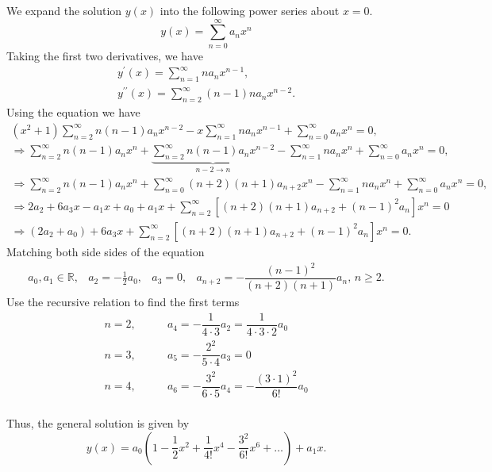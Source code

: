 \documentclass[11pt]{article}
\begin{document}
\begin{solution}
 We expand the solution $y(x)$ into the following power series about $x=0$.
\begin{equation*}
y(x) = \sum_{n=0}^{\infty} a_{n} x^n
\end{equation*}
Taking the first two derivatives, we have
\begin{gather*}
y^{\prime}(x) =  \sum_{n=1}^{\infty} n a_{n} x^{n-1}, \\
y^{\prime \prime}(x) = \sum_{n=2}^{\infty} (n-1)n a_{n} x^{n-2}.
\end{gather*}
Using the equation we have
\begin{gather*}
(x^2 + 1)\sum_{n=2}^{\infty}n(n-1)a_{n}x^{n-2} -x \sum_{n=1}^{\infty} na_{n}x^{n-1} + \sum_{n=0}^{\infty} a_{n}x^{n} = 0, \\
\Rightarrow \sum_{n=2}^{\infty}n(n-1)a_{n}x^{n} + \underbrace{\sum_{n=2}^{\infty}n(n-1)a_{n}x^{n-2}}_{n-2\rightarrow n} - \sum_{n=1}^{\infty} na_{n}x^{n} + \sum_{n=0}^{\infty} a_{n}x^{n} = 0, \\
\Rightarrow \sum_{n=2}^{\infty}n(n-1)a_{n}x^{n} + \sum_{n=0}^{\infty}(n+2)(n+1)a_{n+2}x^{n} - \sum_{n=1}^{\infty} na_{n}x^{n} + \sum_{n=0}^{\infty} a_{n}x^{n} = 0, \\
\Rightarrow 2a_{2} + 6 a_{3}x - a_{1}x + a_{0} + a_{1}x + \sum_{n=2}^{\infty}[(n+2)(n+1)a_{n+2} + (n-1)^{2}a_{n}]x^{n} =0 \\
\Rightarrow (2a_{2} + a_{0}) + 6 a_{3} x + \sum_{n=2}^{\infty}[(n+2)(n+1)a_{n+2} + (n-1)^{2}a_{n}]x^{n} =0.
\end{gather*}
Matching both side sides  of the equation
\begin{equation*}
\begin{array}{cccc}
a_{0},a_{1}\in \mathbb{R}, & a_{2}=-\frac{1}{2}a_{0}, & a_{3}=0, & a_{n+2}=-\dfrac{(n-1)^{2}}{(n+2)(n+1)}a_{n},\,n\geq 2.
\end{array}
\end{equation*}
Use the recursive relation to find the first terms
\begin{align*}
n=2, & \qquad a_{4}=-\dfrac{1}{4\cdot 3} a_{2} = \dfrac{1}{4\cdot 3\cdot 2}a_{0}\\
n=3, & \qquad a_{5}=-\dfrac{2^{2}}{5\cdot 4} a_{3} = 0\\
n=4, & \qquad a_{6}=-\dfrac{3^{2}}{6\cdot 5} a_{4} = -\dfrac{(3\cdot 1)^{2}}{6!}a_{0}\\
\end{align*}

Thus, the general solution is given by
\begin{equation*}
\boxed{y(x)=a_{0}\left( 1 - \frac{1}{2}x^{2} + \frac{1}{4!}x^{4} - \frac{3^{2}}{6!}x^{6}+\dots \right) + a_{1}x.}
\end{equation*}


\end{solution}
\end{document}

